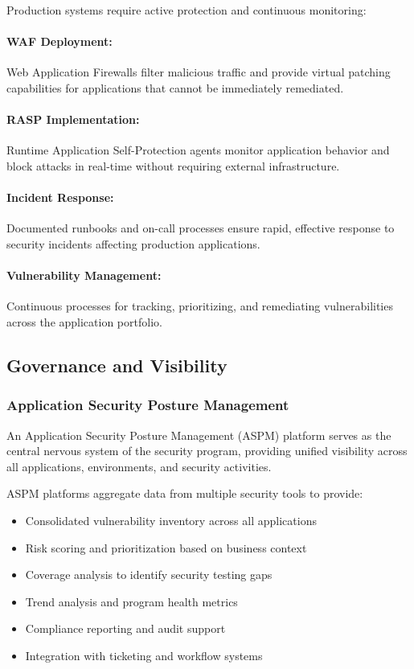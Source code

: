 \documentclass[11pt,letterpaper]{article}
\begin{document}
Production systems require active protection and continuous monitoring:

\paragraph{WAF Deployment:} Web Application Firewalls filter malicious traffic and provide virtual patching capabilities for applications that cannot be immediately remediated.

\paragraph{RASP Implementation:} Runtime Application Self-Protection agents monitor application behavior and block attacks in real-time without requiring external infrastructure.

\paragraph{Incident Response:} Documented runbooks and on-call processes ensure rapid, effective response to security incidents affecting production applications.

\paragraph{Vulnerability Management:} Continuous processes for tracking, prioritizing, and remediating vulnerabilities across the application portfolio.

\subsection{Governance and Visibility}

\subsubsection{Application Security Posture Management}

An Application Security Posture Management (ASPM) platform serves as the central nervous system of the security program, providing unified visibility across all applications, environments, and security activities.

\begin{notebox}
ASPM platforms aggregate data from multiple security tools to provide:
\begin{itemize}[leftmargin=1.5em, itemsep=0.15em]
    \item Consolidated vulnerability inventory across all applications
    \item Risk scoring and prioritization based on business context
    \item Coverage analysis to identify security testing gaps
    \item Trend analysis and program health metrics
    \item Compliance reporting and audit support
    \item Integration with ticketing and workflow systems
\end{itemize}
\end{notebox}
\end{document}
